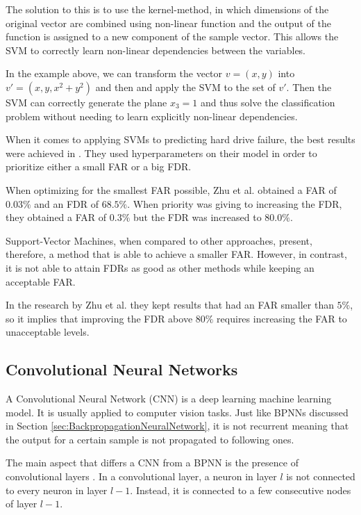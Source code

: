The solution to this is to use the kernel-method, in which dimensions of the original vector are combined using non-linear function and the output of the function is assigned to a new component of the sample vector.
This allows the SVM to correctly learn non-linear dependencies between the variables.

In the example above, we can transform the vector $v = (x, y)$ into $v' = (x, y, x^2 + y^2)$ and then and apply the SVM to the set of $v'$.
Then the SVM can correctly generate the plane $x_3 = 1$ and thus solve the classification problem without needing to learn explicitly non-linear dependencies.

When it comes to applying SVMs to predicting hard drive failure, the best results were achieved in \cite{Zhu13}.
They used hyperparameters on their model in order to prioritize either a small FAR or a big FDR.

When optimizing for the smallest FAR possible, Zhu et al. obtained a FAR of $0.03\%$ and an FDR of $68.5\%$.
When priority was giving to increasing the FDR, they obtained a FAR of $0.3\%$ but the FDR was increased to $80.0\%$.

Support-Vector Machines, when compared to other approaches, present, therefore, a method that is able to achieve a smaller FAR.
However, in contrast, it is not able to attain FDRs as good as other methods while keeping an acceptable FAR.

In the research by Zhu et al. they kept results that had an FAR smaller than $5\%$, so it implies that improving the FDR above $80\%$ requires increasing the FAR to unacceptable levels.

\subsection{Convolutional Neural Networks}

A Convolutional Neural Network (CNN) is a deep learning machine learning model.
It is usually applied to computer vision tasks.
Just like BPNNs discussed in Section \ref{sec:BackpropagationNeuralNetwork}, it is not recurrent meaning that the output for a certain sample is not propagated to following ones.

The main aspect that differs a CNN from a BPNN is the presence of convolutional layers \cite{o2015introduction}.
In a convolutional layer, a neuron in layer $l$ is not connected to every neuron in layer $l-1$.
Instead, it is connected to a few consecutive nodes of layer $l-1$.

